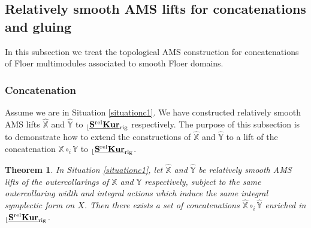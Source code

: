 \documentclass[reqno, 10pt]{amsart}
\numberwithin{equation}{section}
\numberwithin{equation}{section}
\newtheorem{thm}{Theorem}[section]
\theoremstyle{definition}
\theoremstyle{remark}
\newcommand{\mb}{\mathbb}
\renewcommand{\outer}{{}_{\lfloor}}
\newcommand{\uds}[1]{\underline{\smash{#1}}}
\begin{document}
\subsection{Relatively smooth AMS lifts for concatenations and gluing}

In this subsection we treat the topological AMS construction for concatenations of Floer multimodules associated to smooth Floer domains.

\subsubsection{Concatenation}

Assume we are in Situation \ref{situationc1}. We have constructed relatively smooth AMS lifts $\hat{\mb X}$ and $\hat{\mb Y}$ to $\outer \uds{\bf S^{\rm rel} Kur}_{\rm rig}$ respectively. The purpose of this subsection is to demonstrate how to extend the constructions of $\hat{\mb X}$ and $\hat{\mb Y}$ to a lift of the concatenation ${\mb X} \circ_i {\mb Y}$ to $\outer \uds{\bf S^{\rm rel} Kur}_{\rm rig}$. 




\begin{thm}\label{thm_AMS_concatenation_1}
In Situation \ref{situationc1}, let $\hat {\mb X}$ and $\hat {\mb Y}$ be relatively smooth AMS lifts of the outercollarings of ${\mb X}$ and ${\mb Y}$ respectively, subject to the same outercollaring width and integral actions which induce the same integral symplectic form on $X$. Then there exists a set of concatenations $\hat {\mb X} \circ_i \hat {\mb Y}$ enriched in $\outer \uds{\bf S^{\rm rel} Kur}_{\rm rig}$.
\end{thm}
\end{document}
